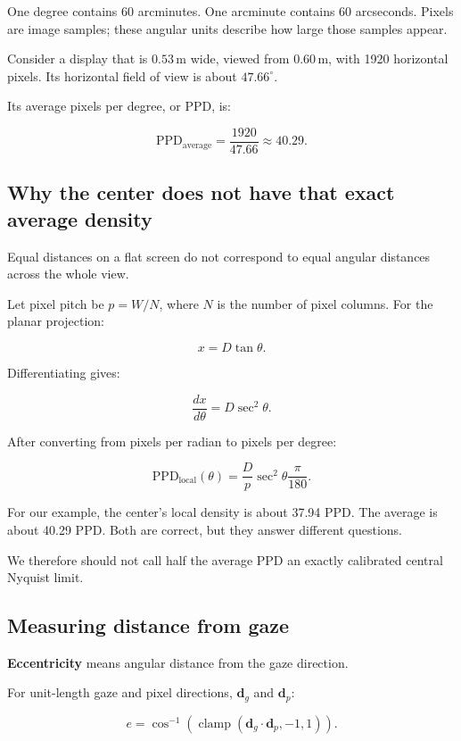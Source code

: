 One degree contains 60 arcminutes. One arcminute contains 60 arcseconds. Pixels are image samples; these angular units describe how large those samples appear.

Consider a display that is \(0.53\,\mathrm{m}\) wide, viewed from \(0.60\,\mathrm{m}\), with 1920 horizontal pixels. Its horizontal field of view is about \(47.66^\circ\).

Its average pixels per degree, or PPD, is:

\[
\mathrm{PPD}_{\mathrm{average}}
=\frac{1920}{47.66}
\approx40.29.
\]

\subsection{Why the center does not have that exact average density}\label{04-visual-computing-ii-ch043-why-the-center-does-not-have-that-exact-average-density}

Equal distances on a flat screen do not correspond to equal angular distances across the whole view.

Let pixel pitch be \(p=W/N\), where \(N\) is the number of pixel columns. For the planar projection:

\[
x=D\tan\theta.
\]

Differentiating gives:

\[
\frac{dx}{d\theta}=D\sec^2\theta.
\]

After converting from pixels per radian to pixels per degree:

\[
\mathrm{PPD}_{\mathrm{local}}(\theta)
=\frac{D}{p}\sec^2\theta\frac{\pi}{180}.
\]

For our example, the center's local density is about 37.94 PPD. The average is about 40.29 PPD. Both are correct, but they answer different questions.

We therefore should not call half the average PPD an exactly calibrated central Nyquist limit.

\subsection{Measuring distance from gaze}\label{04-visual-computing-ii-ch043-measuring-distance-from-gaze}

\textbf{Eccentricity} means angular distance from the gaze direction.

For unit-length gaze and pixel directions, \(\mathbf d_g\) and \(\mathbf d_p\):

\[
e=\cos^{-1}\left(
\operatorname{clamp}(\mathbf d_g\cdot\mathbf d_p,-1,1)
\right).
\]

